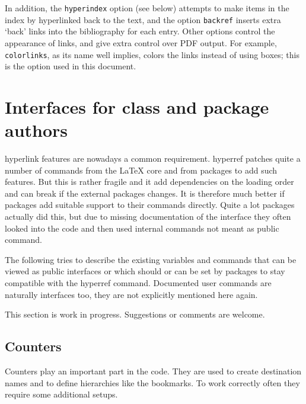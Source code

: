 \documentclass{article}
\newcommand*{\xpackage}[1]{\textsf{#1}}
\begin{document}
In addition, the \texttt{hyperindex} option (see below) attempts to make
items in the index by hyperlinked back to the text, and the option
\texttt{backref} inserts extra `back' links into the bibliography for
each entry. Other options control the appearance of links, and give
extra control over PDF output. For example, \texttt{colorlinks}, as its
name well implies, colors the links instead of using boxes; this is the
option used in this document.

\section{Interfaces for class and package authors}

hyperlink features are nowadays a common requirement. \xpackage{hyperref}
patches quite a number of commands from the  \LaTeX{} core and from packages
to add such features. But this is rather fragile and it add dependencies
on the loading order and can break if the external packages changes.
It is therefore much better if packages add suitable support to their commands directly.
Quite a lot packages actually did this, but due to missing documentation of the interface
they often looked into the code and then used internal commands not meant as public command.

The following tries to describe the existing variables and commands that
can be viewed as public interfaces or which should or can be set by packages
to stay compatible with the \xpackage{hyperref} command. Documented user commands
are naturally interfaces too, they are not explicitly mentioned here again.

This section is work in progress. Suggestions or comments are welcome.


\subsection{Counters}
Counters play an important part in the code. They are used to create destination names and
to define hierarchies like the bookmarks. To work correctly often they require some additional
setups.
\end{document}
